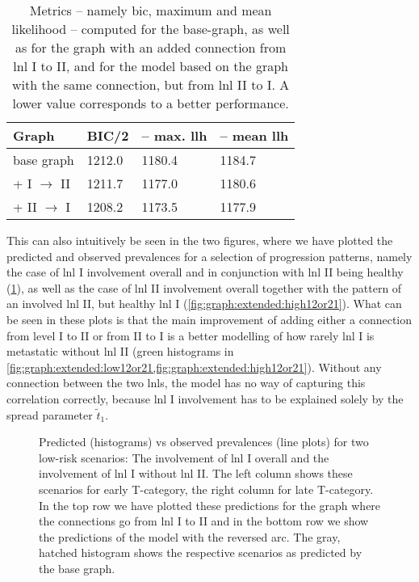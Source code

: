 \documentclass[\relativeRoot/main.tex]{subfiles}
\begin{document}
\begin{table}
    \centering
        \begin{tabular}{|l|l|l|l|}
            \hline
            \textbf{Graph} & \textbf{BIC/2} & \textbf{-- max. llh} & \textbf{-- mean llh} \\
            \hline
            base graph & 1212.0 & 1180.4 & 1184.7 \\
            + I $\rightarrow$ II & 1211.7 & 1177.0 & 1180.6 \\
            + II $\rightarrow$ I & 1208.2 & 1173.5 & 1177.9 \\
            \hline
        \end{tabular}
        \caption[
            Comparison of performance metrics for connection between LNL I and II
        ]{
            Metrics -- namely \gls{bic}, maximum and mean likelihood -- computed for the base-graph, as well as for the graph with an added connection from \gls{lnl} I to II, and for the model based on the graph with the same connection, but from \gls{lnl} II to I. A lower value corresponds to a better performance.
        }
        \label{table:graph:extend:12or21}
\end{table}

This can also intuitively be seen in the two figures, where we have plotted the predicted and observed prevalences for a selection of progression patterns, namely the case of \gls{lnl} I involvement overall and in conjunction with \gls{lnl} II being healthy (\cref{fig:graph:extended:low12or21}), as well as the case of \gls{lnl} II involvement overall together with the pattern of an involved \gls{lnl} II, but healthy \gls{lnl} I (\cref{fig:graph:extended:high12or21}). What can be seen in these plots is that the main improvement of adding either a connection from level I to II or from II to I is a better modelling of how rarely \gls{lnl} I is metastatic without \gls{lnl} II (green histograms in \cref{fig:graph:extended:low12or21,fig:graph:extended:high12or21}). Without any connection between the two \glspl{lnl}, the model has no way of capturing this correlation correctly, because \gls{lnl} I involvement has to be explained solely by the spread parameter $\tilde{t}_1$.

\begin{figure}
    \centering
    \def\svgwidth{1.0\textwidth}
    
    \caption[
        Comparison of prevalences of low-risk scenarios for the two directions of the arc between LNL I and II
    ]{
        Predicted (histograms) vs observed prevalences (line plots) for two low-risk scenarios: The involvement of \gls{lnl} I overall and the involvement of \gls{lnl} I without \gls{lnl} II. The left column shows these scenarios for early T-category, the right column for late T-category. In the top row we have plotted these predictions for the graph where the connections go from \gls{lnl} I to II and in the bottom row we show the predictions of the model with the reversed arc. The gray, hatched histogram shows the respective scenarios as predicted by the base graph.
    }
    \label{fig:graph:extended:low12or21}
\end{figure}
\end{document}
